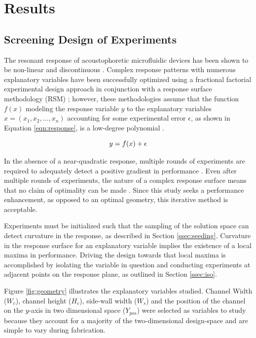 \section{Results}
\label{sec:results}

\subsection{Screening Design of Experiments}
\label{ssec:doe}
The resonant response of acoustophoretic microfluidic devices has been shown to be non-linear and discontinuous \cite{garofalo2016performance}. Complex response patterns with numerous explanatory variables have been successfully optimized using a fractional factorial experimental design approach in conjunction with a response surface methodology (RSM) \cite{muriithi2015application}; however, these methodologies assume that the function $f(x)$ modeling the response variable $y$ to the explanatory variables $x=(x_1,x_2,\dots,x_n)$ accounting for some experimental error $\epsilon$, as shown in Equation \ref{eqn:response}, is a low-degree polynomial \cite{khuri2010response}. 

\begin{equation}
\label{eqn:response}
  \hfill y=f(x)+\epsilon \hfill
\end{equation}

In the absence of a near-quadratic response, multiple rounds of experiments are required to adequately detect a positive gradient in performance \cite{carley2004response}. Even after multiple rounds of experiments, the nature of a complex response surface means that no claim of optimality can be made \cite{box2006improving}. Since this study seeks a performance enhancement, as opposed to an optimal geometry, this iterative method is acceptable. 

Experiments must be initialized such that the sampling of the solution space can detect curvature in the response, as described in Section \ref{ssec:seeding}. Curvature in the response surface for an explanatory variable implies the existence of a local maxima in performance. Driving the design towards that local maxima is accomplished by isolating the variable in question and conducting experiments at adjacent points on the response plane, as outlined in Section \ref{ssec:iso}. 

Figure \ref{fig:geometry} illustrates the explanatory variables studied. Channel Width ($W_c$), channel height ($H_c$), side-wall width ($W_s$) and the position of the channel on the $y$-axis in two dimensional space ($Y_{pos}$) were selected as variables to study because they account for a majority of the two-dimensional design-space and are simple to vary during fabrication.


